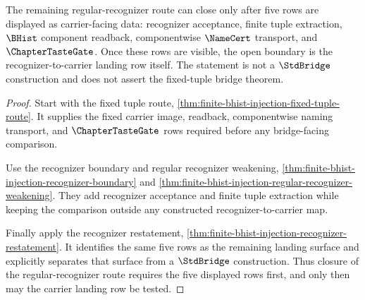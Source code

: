 \begin{theorem}
\label{thm:finite-bhist-injection-regular-recognizer-landing-closure}
The remaining regular-recognizer route can close only after five rows are displayed as carrier-facing data: recognizer acceptance, finite tuple extraction, $\BHist$ component readback, componentwise $\NameCert$ transport, and $\ChapterTasteGate$. Once these rows are visible, the open boundary is the recognizer-to-carrier landing row itself. The statement is not a $\StdBridge$ construction and does not assert the fixed-tuple bridge theorem.
\end{theorem}
\begin{proof}
Start with the fixed tuple route, \autoref{thm:finite-bhist-injection-fixed-tuple-route}. It supplies the fixed carrier image, readback, componentwise naming transport, and $\ChapterTasteGate$ rows required before any bridge-facing comparison.

Use the recognizer boundary and regular recognizer weakening, \autoref{thm:finite-bhist-injection-recognizer-boundary} and \autoref{thm:finite-bhist-injection-regular-recognizer-weakening}. They add recognizer acceptance and finite tuple extraction while keeping the comparison outside any constructed recognizer-to-carrier map.

Finally apply the recognizer restatement, \autoref{thm:finite-bhist-injection-recognizer-restatement}. It identifies the same five rows as the remaining landing surface and explicitly separates that surface from a $\StdBridge$ construction. Thus closure of the regular-recognizer route requires the five displayed rows first, and only then may the carrier landing row be tested.
\end{proof}

